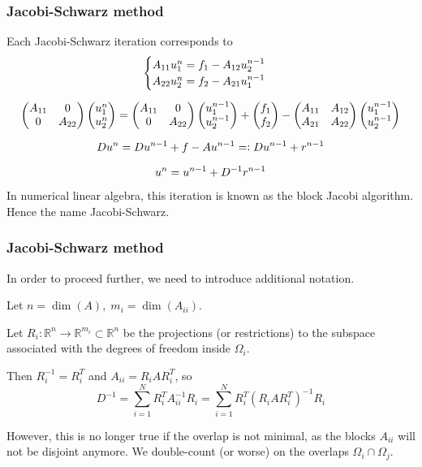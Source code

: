 \documentclass{beamer}
\newcommand{\R}{\mathbb{R}}
\begin{document}
\begin{frame}
\frametitle{Jacobi-Schwarz method}
Each Jacobi-Schwarz iteration corresponds to
\begin{gather*}
\begin{cases}
A_{11} u_1^n = f_1 - A_{12} u_2^{n-1} \\
A_{22} u_2^n = f_2 - A_{21} u_1^{n-1}
\end{cases} \\[6pt]
\begin{pmatrix} A_{11} & 0 \\ 0 & A_{22} \end{pmatrix}
\begin{pmatrix} u_1^n \\ u_2^n \end{pmatrix}
= \begin{pmatrix} A_{11} & 0 \\ 0 & A_{22} \end{pmatrix}
  \begin{pmatrix} u_1^{n-1} \\ u_2^{n-1} \end{pmatrix}
+ \begin{pmatrix} f_1 \\ f_2 \end{pmatrix}
- \begin{pmatrix} A_{11} & A_{12} \\ A_{21} & A_{22} \end{pmatrix}
  \begin{pmatrix} u_1^{n-1} \\ u_2^{n-1} \end{pmatrix} \\[6pt]
D u^n = D u^{n-1} + f - A u^{n-1} =\vcentcolon D u^{n-1} + r^{n-1} \\[6pt]
u^n = u^{n-1} + D^{-1} r^{n-1}
\end{gather*}
In numerical linear algebra, this iteration is known as the
block Jacobi algorithm. Hence the name Jacobi-Schwarz.
\end{frame}

\begin{frame}
\frametitle{Jacobi-Schwarz method}
In order to proceed further, we need to introduce additional notation.

Let $n = \dim(A), \; m_i = \dim(A_{ii})$.

Let $R_i \colon \R^n \to \R^{m_i} \subset \R^n$ be the projections (or restrictions)
to the subspace associated with the degrees of freedom inside $\Omega_i$.

Then $R_i^{-1} = R_i^T$ and $A_{ii} = R_i A R_i^T$, so
\[
D^{-1}
= \sum_{i=1}^N R_i^T A_{ii}^{-1} R_i
= \sum_{i=1}^N R_i^T (R_i A R_i^T)^{-1} R_i
\]

However, this is no longer true if the overlap is not minimal,
as the blocks $A_{ii}$ will not be disjoint anymore.
We double-count (or worse) on the overlaps $\Omega_i \cap \Omega_j$.
\end{frame}
\end{document}
